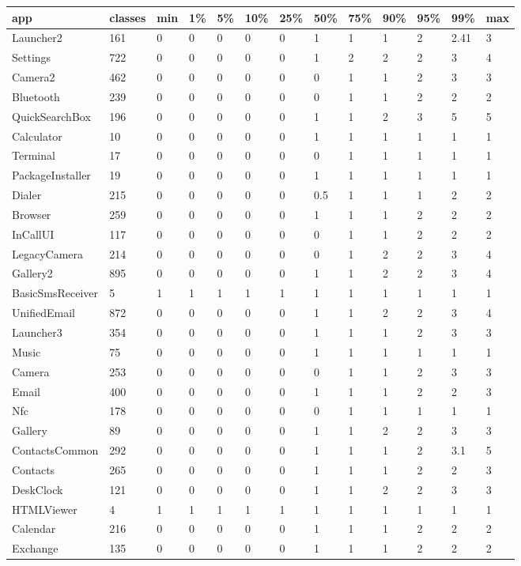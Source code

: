 \begin{tabular}{|l|l|l|l|l|l|l|l|l|l|l|l|l|}
\hline
app&classes&min&1\%&5\%&10\%&25\%&50\%&75\%&90\%&95\%&99\%&max\\
\hline
Launcher2&161&0&0&0&0&0&1&1&1&2&2.41&3\\
\hline
Settings&722&0&0&0&0&0&1&2&2&2&3&4\\
\hline
Camera2&462&0&0&0&0&0&0&1&1&2&3&3\\
\hline
Bluetooth&239&0&0&0&0&0&0&1&1&2&2&2\\
\hline
QuickSearchBox&196&0&0&0&0&0&1&1&2&3&5&5\\
\hline
Calculator&10&0&0&0&0&0&1&1&1&1&1&1\\
\hline
Terminal&17&0&0&0&0&0&0&1&1&1&1&1\\
\hline
PackageInstaller&19&0&0&0&0&0&1&1&1&1&1&1\\
\hline
Dialer&215&0&0&0&0&0&0.5&1&1&1&2&2\\
\hline
Browser&259&0&0&0&0&0&1&1&1&2&2&2\\
\hline
InCallUI&117&0&0&0&0&0&0&1&1&2&2&2\\
\hline
LegacyCamera&214&0&0&0&0&0&0&1&2&2&3&4\\
\hline
Gallery2&895&0&0&0&0&0&1&1&2&2&3&4\\
\hline
BasicSmsReceiver&5&1&1&1&1&1&1&1&1&1&1&1\\
\hline
UnifiedEmail&872&0&0&0&0&0&1&1&2&2&3&4\\
\hline
Launcher3&354&0&0&0&0&0&1&1&1&2&3&3\\
\hline
Music&75&0&0&0&0&0&1&1&1&1&1&1\\
\hline
Camera&253&0&0&0&0&0&0&1&1&2&3&3\\
\hline
Email&400&0&0&0&0&0&1&1&1&2&2&3\\
\hline
Nfc&178&0&0&0&0&0&0&1&1&1&1&1\\
\hline
Gallery&89&0&0&0&0&0&1&1&2&2&3&3\\
\hline
ContactsCommon&292&0&0&0&0&0&1&1&1&2&3.1&5\\
\hline
Contacts&265&0&0&0&0&0&1&1&1&2&2&3\\
\hline
DeskClock&121&0&0&0&0&0&1&1&2&2&3&3\\
\hline
HTMLViewer&4&1&1&1&1&1&1&1&1&1&1&1\\
\hline
Calendar&216&0&0&0&0&0&1&1&1&2&2&2\\
\hline
Exchange&135&0&0&0&0&0&1&1&1&2&2&2\\
\hline
\end{tabular}
